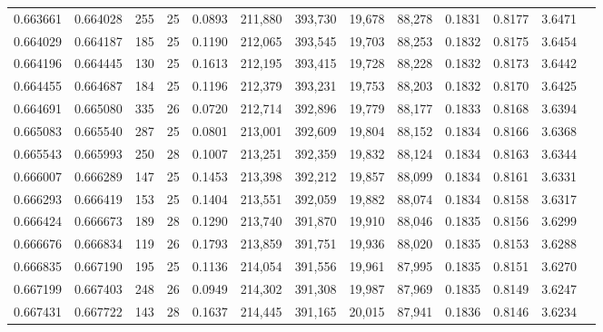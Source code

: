 \begin{tabular}{rrrrrrrrrrrrr}
0.663661 & 0.664028 &   255 &  25 &                                     0.0893 & 211,880 & 393,730 &  19,678 &  88,278 & 0.1831 & 0.8177 & 3.6471 \\
0.664029 & 0.664187 &   185 &  25 &                                     0.1190 & 212,065 & 393,545 &  19,703 &  88,253 & 0.1832 & 0.8175 & 3.6454 \\
0.664196 & 0.664445 &   130 &  25 &                                     0.1613 & 212,195 & 393,415 &  19,728 &  88,228 & 0.1832 & 0.8173 & 3.6442 \\
0.664455 & 0.664687 &   184 &  25 &                                     0.1196 & 212,379 & 393,231 &  19,753 &  88,203 & 0.1832 & 0.8170 & 3.6425 \\
0.664691 & 0.665080 &   335 &  26 &                                     0.0720 & 212,714 & 392,896 &  19,779 &  88,177 & 0.1833 & 0.8168 & 3.6394 \\
0.665083 & 0.665540 &   287 &  25 &                                     0.0801 & 213,001 & 392,609 &  19,804 &  88,152 & 0.1834 & 0.8166 & 3.6368 \\
0.665543 & 0.665993 &   250 &  28 &                                     0.1007 & 213,251 & 392,359 &  19,832 &  88,124 & 0.1834 & 0.8163 & 3.6344 \\
0.666007 & 0.666289 &   147 &  25 &                                     0.1453 & 213,398 & 392,212 &  19,857 &  88,099 & 0.1834 & 0.8161 & 3.6331 \\
0.666293 & 0.666419 &   153 &  25 &                                     0.1404 & 213,551 & 392,059 &  19,882 &  88,074 & 0.1834 & 0.8158 & 3.6317 \\
0.666424 & 0.666673 &   189 &  28 &                                     0.1290 & 213,740 & 391,870 &  19,910 &  88,046 & 0.1835 & 0.8156 & 3.6299 \\
0.666676 & 0.666834 &   119 &  26 &                                     0.1793 & 213,859 & 391,751 &  19,936 &  88,020 & 0.1835 & 0.8153 & 3.6288 \\
0.666835 & 0.667190 &   195 &  25 &                                     0.1136 & 214,054 & 391,556 &  19,961 &  87,995 & 0.1835 & 0.8151 & 3.6270 \\
0.667199 & 0.667403 &   248 &  26 &                                     0.0949 & 214,302 & 391,308 &  19,987 &  87,969 & 0.1835 & 0.8149 & 3.6247 \\
0.667431 & 0.667722 &   143 &  28 &                                     0.1637 & 214,445 & 391,165 &  20,015 &  87,941 & 0.1836 & 0.8146 & 3.6234 \\

\end{tabular}
